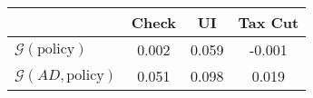 \begin{tabular}{@{}lccc@{}}
\toprule
                          & Check      & UI    & Tax Cut    \\  \midrule
$\mathcal{G}(\text{policy})$ & 0.002  & 0.059  & -0.001     \\
$\mathcal{G}(AD,\text{policy})$ & 0.051  & 0.098  & 0.019     \\
\end{tabular}
